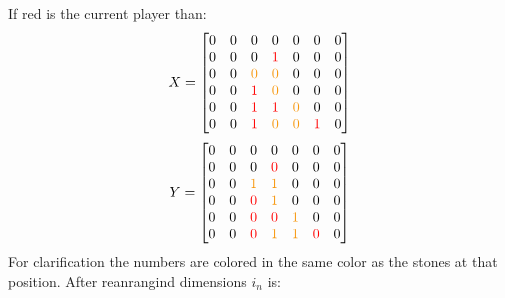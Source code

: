\documentclass[12pt]{article}
\newcommand{\mathColor}[2]{\color{#1}#2\color{black}}
\newcommand{\gold}{YellowOrange}
\begin{document}
If red is the current player than:
\[
X = \left[
\begin{matrix}
\mathColor{black}{0} & \mathColor{black}{0} & \mathColor{black}{0} & \mathColor{black}{0} & \mathColor{black}{0} & \mathColor{black}{0} & \mathColor{black}{0}\\
\mathColor{black}{0} & \mathColor{black}{0} & \mathColor{black}{0} & \mathColor{red}{1}     & \mathColor{black}{0} & \mathColor{black}{0} & \mathColor{black}{0}\\
\mathColor{black}{0} & \mathColor{black}{0} & \mathColor{\gold}{0} & \mathColor{\gold}{0} & \mathColor{black}{0} & \mathColor{black}{0} & \mathColor{black}{0}\\
\mathColor{black}{0} & \mathColor{black}{0} & \mathColor{red}{1}     & \mathColor{\gold}{0} & \mathColor{black}{0} & \mathColor{black}{0} & \mathColor{black}{0}\\
\mathColor{black}{0} & \mathColor{black}{0} & \mathColor{red}{1}     & \mathColor{red}{1}     & \mathColor{\gold}{0} & \mathColor{black}{0} & \mathColor{black}{0}\\
\mathColor{black}{0} & \mathColor{black}{0} & \mathColor{red}{1}     & \mathColor{\gold}{0} & \mathColor{\gold}{0} & \mathColor{red}{1}     & \mathColor{black}{0}\\
\end{matrix}
\right]
\]\[
Y= \left[
\begin{matrix}
\mathColor{black}{0} & \mathColor{black}{0} & \mathColor{black}{0} & \mathColor{black}{0} & \mathColor{black}{0} & \mathColor{black}{0} & \mathColor{black}{0}\\
\mathColor{black}{0} & \mathColor{black}{0} & \mathColor{black}{0} & \mathColor{red}{0}     & \mathColor{black}{0} & \mathColor{black}{0} & \mathColor{black}{0}\\
\mathColor{black}{0} & \mathColor{black}{0} & \mathColor{\gold}{1} & \mathColor{\gold}{1} & \mathColor{black}{0} & \mathColor{black}{0} & \mathColor{black}{0}\\
\mathColor{black}{0} & \mathColor{black}{0} & \mathColor{red}{0}     & \mathColor{\gold}{1} & \mathColor{black}{0} & \mathColor{black}{0} & \mathColor{black}{0}\\
\mathColor{black}{0} & \mathColor{black}{0} & \mathColor{red}{0}     & \mathColor{red}{0}     & \mathColor{\gold}{1} & \mathColor{black}{0} & \mathColor{black}{0}\\
\mathColor{black}{0} & \mathColor{black}{0} & \mathColor{red}{0}     & \mathColor{\gold}{1} & \mathColor{\gold}{1} & \mathColor{red}{0}     & \mathColor{black}{0}\\
\end{matrix}
\right]
\] For clarification the numbers are colored in the same color as the stones at that position. After reanrangind dimensions \(i_n\) is:
\end{document}
